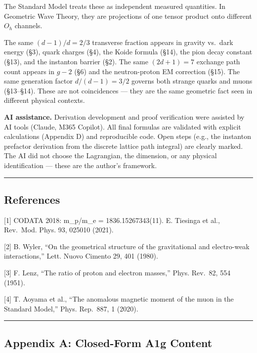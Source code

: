 \documentclass[
]{article}
\begin{document}
The Standard Model treats these as independent measured quantities. In
Geometric Wave Theory, they are projections of one tensor product onto
different \(O_h\) channels.

The same \((d\!-\!1)/d = 2/3\) transverse fraction appears in gravity
vs.~dark energy (§3), quark charges (§4), the Koide formula (§14), the
pion decay constant (§13), and the instanton barrier (§2). The same
\((2d\!+\!1) = 7\) exchange path count appears in \(g\!-\!2\) (§6) and
the neutron-proton EM correction (§15). The same generation factor
\(d/(d\!-\!1) = 3/2\) governs both strange quarks and muons (§13--§14).
These are not coincidences --- they are the same geometric fact seen in
different physical contexts.

\textbf{AI assistance.} Derivation development and proof verification
were assisted by AI tools (Claude, M365 Copilot). All final formulas are
validated with explicit calculations (Appendix D) and reproducible code.
Open steps (e.g., the instanton prefactor derivation from the discrete
lattice path integral) are clearly marked. The AI did not choose the
Lagrangian, the dimension, or any physical identification --- these are
the author's framework.

\begin{center}\rule{0.5\linewidth}{0.5pt}\end{center}

\subsection{References}\label{references}

{[}1{]} CODATA 2018: m\_p/m\_e = 1836.15267343(11). E. Tiesinga et al.,
Rev.~Mod. Phys. 93, 025010 (2021).

{[}2{]} B. Wyler, ``On the geometrical structure of the gravitational
and electro-weak interactions,'' Lett. Nuovo Cimento 29, 401 (1980).

{[}3{]} F. Lenz, ``The ratio of proton and electron masses,'' Phys.
Rev.~82, 554 (1951).

{[}4{]} T. Aoyama et al., ``The anomalous magnetic moment of the muon in
the Standard Model,'' Phys. Rep.~887, 1 (2020).

\begin{center}\rule{0.5\linewidth}{0.5pt}\end{center}

\subsection{Appendix A: Closed-Form A1g
Content}\label{appendix-a-closed-form-a1g-content}
\end{document}
